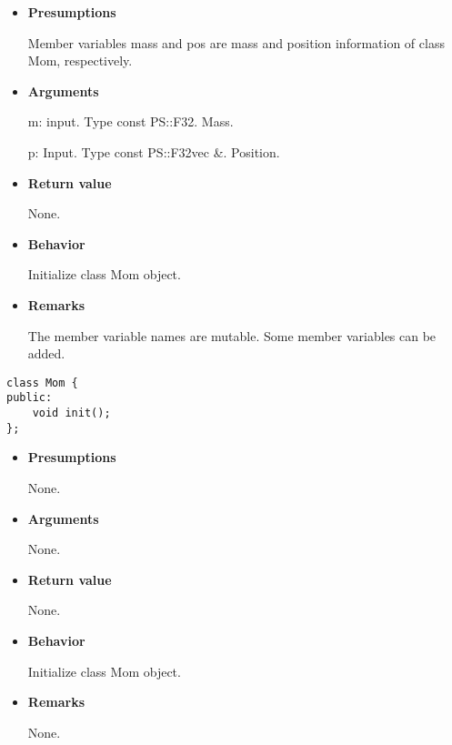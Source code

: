 \begin{itemize}

\item {\bf Presumptions}

  Member variables mass and pos are mass and position information of
  class Mom, respectively.
  
\item {\bf Arguments}

  m: input. Type const PS::F32. Mass.

  p: Input. Type const PS::F32vec \&. Position.
  
\item {\bf Return value}

  None.

\item {\bf Behavior}

  Initialize class Mom object.
  
\item {\bf Remarks}

  The member variable names are mutable. Some member variables can be
  added.

\end{itemize}


\begin{screen}
\begin{verbatim}
class Mom {
public:
    void init();
};
\end{verbatim}
\end{screen}

\begin{itemize}

\item {\bf Presumptions}

  None.
  
\item {\bf Arguments}

  None.
  
\item {\bf Return value}

  None.

\item {\bf Behavior}

  Initialize class Mom object.
  
\item {\bf Remarks}

  None.

\end{itemize}

